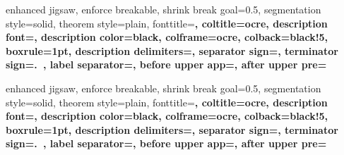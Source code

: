 %
{enhanced jigsaw,%
	enforce breakable,%
	shrink break goal=0.5\baselineskip,%
	segmentation style=solid,%
	theorem style=plain,%
	fonttitle=\sffamily\upshape\bfseries\small,%
	coltitle=ocre,%
	description font=\sffamily\upshape\bfseries\small,%
	description color=black,%
	colframe=ocre,%
	colback=black!5,%
	boxrule=1pt,%
	description delimiters={}{},%
	separator sign={\nobreakspace {\color{black}---}},%
	terminator sign={.\ },%
	label separator=,
	before upper app={},%
	after upper pre={\popdimen{\parindent}}}%
{}

%
{enhanced jigsaw,%
	enforce breakable,%
	shrink break goal=0.5\baselineskip,%
	segmentation style=solid,%
	theorem style=plain,%
	fonttitle=\sffamily\upshape\bfseries\small,%
	coltitle=ocre,%
	description font=\sffamily\upshape\bfseries\small,%
	description color=black,%
	colframe=ocre,%
	colback=black!5,%
	boxrule=1pt,%
	description delimiters={}{},%
	separator sign={\nobreakspace {\color{black}---}},%
	terminator sign={.\ },%
	label separator=,
	before upper app={},%
	after upper pre={\popdimen{\parindent}}}%
{}

